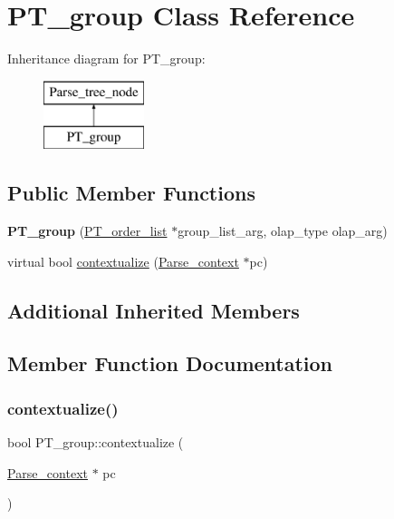 \hypertarget{classPT__group}{}\section{P\+T\+\_\+group Class Reference}
\label{classPT__group}
Inheritance diagram for P\+T\+\_\+group\+:\begin{figure}[H]
\begin{center}
\leavevmode
\includegraphics[height=2.000000cm]{classPT__group}
\end{center}
\end{figure}
\subsection*{Public Member Functions}
\begin{DoxyCompactItemize}
\item 
\mbox{\label{classPT__group_ad6f421c600154f379e8a2caa939d7569}} 
{\bfseries P\+T\+\_\+group} (\mbox{\hyperlink{classPT__order__list}{P\+T\+\_\+order\+\_\+list}} $\ast$group\+\_\+list\+\_\+arg, olap\+\_\+type olap\+\_\+arg)
\item 
virtual bool \mbox{\hyperlink{classPT__group_a203c5e0e9ab4bb389f230e4113de7f35}{contextualize}} (\mbox{\hyperlink{structParse__context}{Parse\+\_\+context}} $\ast$pc)
\end{DoxyCompactItemize}
\subsection*{Additional Inherited Members}


\subsection{Member Function Documentation}
\mbox{\label{classPT__group_a203c5e0e9ab4bb389f230e4113de7f35}} 
\subsubsection{\texorpdfstring{contextualize()}{contextualize()}}
{\footnotesize\ttfamily bool P\+T\+\_\+group\+::contextualize (\begin{DoxyParamCaption}\item[{\mbox{\hyperlink{structParse__context}{Parse\+\_\+context}} $\ast$}]{pc }\end{DoxyParamCaption})\hspace{0.3cm}{\ttfamily [virtual]}}

